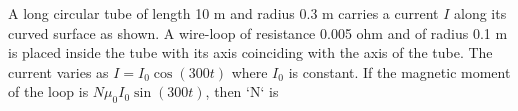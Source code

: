 
\item A long circular tube of length 10 m and radius 0.3 m carries a current \( I \) along its curved surface as shown. A wire-loop of resistance 0.005 ohm and of radius 0.1 m is placed inside the tube with its axis coinciding with the axis of the tube. The current varies as \( I = I_0 \cos (300t) \) where \( I_0 \) is constant. If the magnetic moment of the loop is \( N \mu_0 I_0 \sin (300t) \), then `N` is
\begin{center}
\end{center}
